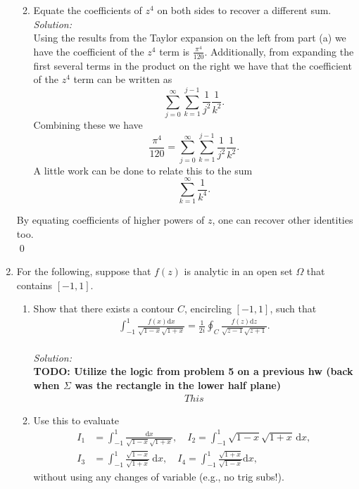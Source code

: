\documentclass[10pt]{amsart}
\newcommand{\D}{\mathrm{d}}
\theoremstyle{nonumberplain}
\begin{document}
\begin{enumerate}[label={\bf {\arabic*}:}]
\begin{enumerate}
\newpage

\item Equate the coefficients of $z^4$ on both sides to recover a
  different sum. \\

\noindent
\textit{Solution:} \\
Using the results from the Taylor expansion on the left from part (a) we have the coefficient of the $z^4$ term is $ \frac {\pi^4}{120}. $
Additionally, from expanding the first several terms in the product on the right we have that the coefficient of the $z^4$ term can be written as
$$\sum_{j=0}^\infty \sum_{k=1}^{j - 1} \frac 1 {j^2} \frac 1 {k^2}.$$
Combining these we have 
$$\frac {\pi^4}{120} = \sum_{j=0}^\infty \sum_{k=1}^{j - 1} \frac 1 {j^2} \frac 1 {k^2}.$$
A little work can be done to relate this to the sum
$$\sum_{k=1}^\infty \frac 1 {k^4}.$$
\end{enumerate}
By equating coefficients of higher powers of $z$, one can recover
other identities too.\\
\qed \\

\newpage

\item For the following, suppose that $f(z)$ is analytic in an open
  set $\Omega$ that contains $[-1,1]$.  
\begin{enumerate}
\item Show that there exists a contour $C$, encircling $[-1,1]$,
such that 
\begin{align*}
	\int_{-1}^1 \frac{f(x)\D x}{\sqrt{1 -x} \sqrt{1 + x}} =
	\frac{1}{2i} \oint_C \frac{f(z)\D z}{\sqrt{z -1} \sqrt{z + 1}}.
\end{align*} \\

\noindent
\textit{Solution:} \\
\textbf{TODO: Utilize the logic from problem 5 on a previous hw (back when $\Sigma$ was the rectangle in the  lower half plane)}
\begin{align*}
This
\end{align*}

\item Use this to evaluate
\begin{align*}
	I_1 &= \int_{-1}^1 \frac{\D x}{\sqrt{1 -x} \sqrt{1+x}}, \quad
	I_2 = \int_{-1}^1 \sqrt{1 -x} \sqrt{1 + x}\, \D x, \\
	I_3 &= \int_{-1}^1 \frac{\sqrt{1 -x}}{ \sqrt{1 + x}}\ \D x,
	\quad   I_4 = \int_{-1}^1 \frac{\sqrt{1  +x}}{ \sqrt{1 - x}} \D x,
\end{align*}
without using any changes of variable (e.g., no trig subs!).\\


\end{enumerate}
\end{enumerate}
\end{document}
